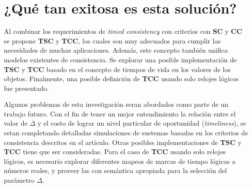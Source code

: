 \section{¿Qué tan exitosa es esta solución?} 
Al combinar los requerimientos de \emph{timed consistency} con criterios con \textbf{SC} y \textbf{CC} se propone \textbf{TSC} y \textbf{TCC}, los cuales son muy adecuados para cumplir las necesidades de muchas aplicaciones. Además, este concepto también unifica modelos existentes de consistencia. Se explorar una posible implementación de \textbf{TSC} y \textbf{TCC} basado en el concepto de tiempos de vida en los valores de los objetos. Finalmente, una posible definición de \textbf{TCC} usando solo relojes lógicos fue presentado.

Algunos problemas de esta investigación seran abordados como parte de un trabajo futuro. Con el fin de tener un mejor entendimiento la relación entre el valor de $\Delta$ y el costo de lograr un nivel particular de oportunidad (\emph{timeliness}), se estan completando detalladas simulaciones de sustemas basadas en los criterios de consistencia descritos en el artículo. Otras posibles implementaciones de \textbf{TSC} y \textbf{TCC} tiene que ser consideradas. Para el caso de \textbf{TCC} usando solo relojes lógicos, es necesario explorar diferentes mapeos de marcas de tiempo lógicas a números reales, y proveer las con semántica apropiada para la selección del parámetro $\Delta$.







